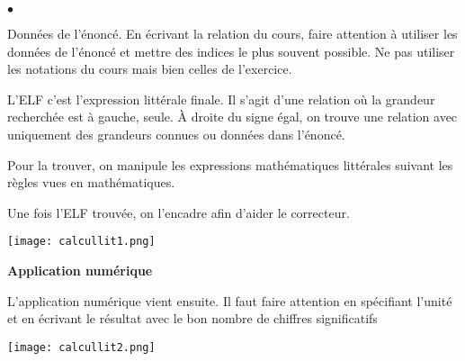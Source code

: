 \documentclass[10pt]{article}
\newcommand{\minititle}[1]{
    \vspace{-5pt}
    \begin{center}
        \textbf{{#1}}
    \end{center}
    \vspace{-5pt}    
}
\begin{document}
\begin{titlebox}
    \begin{minipage}[c]{0.55\textwidth}
        \begin{list}{$\bullet$}{}
            \item Données de l'énoncé. En écrivant la relation du cours, faire attention à utiliser les données de l'énoncé et mettre des indices le plus souvent possible. Ne pas utiliser les notations du cours mais bien celles de l'exercice.

            \item L'ELF c'est l'expression littérale finale. Il s'agit d'une relation où la grandeur recherchée est à gauche, seule. À droite du signe égal, on trouve une relation avec uniquement des grandeurs connues ou données dans l'énoncé.

            \item Pour la trouver, on manipule les expressions mathématiques littérales suivant les règles vues en mathématiques.

            \item Une fois l'ELF trouvée, on l'encadre afin d'aider le correcteur.
        \end{list}
    \end{minipage}
    \hspace{40pt}
    \begin{minipage}[c]{0.35\textwidth}
        \begin{center}
            \texttt{[image: calcullit1.png]}
        \end{center}
    \end{minipage}

    \minititle{Application numérique}

    L'application numérique vient ensuite.
    Il faut faire attention en spécifiant l'unité et en écrivant le résultat
    avec le bon nombre de chiffres significatifs

    \begin{center}
        \texttt{[image: calcullit2.png]}
    \end{center}

\end{titlebox}
\end{document}
